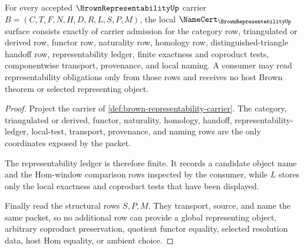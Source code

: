 \begin{theorem}
\label{thm:brown-representability-namecert-obligations}
For every accepted $\BrownRepresentabilityUp$ carrier $B=(C,T,F,N,H,D,R,L,S,P,M)$, the local $\NameCert_{\BrownRepresentabilityUp}$ surface consists exactly of carrier admission for the category row, triangulated or derived row, functor row, naturality row, homology row, distinguished-triangle handoff row, representability ledger, finite exactness and coproduct tests, componentwise transport, provenance, and local naming. A consumer may read representability obligations only from those rows and receives no host Brown theorem or selected representing object.
\end{theorem}
\begin{proof}
Project the carrier of \autoref{def:brown-representability-carrier}. The category, triangulated or derived, functor, naturality, homology, handoff, representability-ledger, local-test, transport, provenance, and naming rows are the only coordinates exposed by the packet.

The representability ledger is therefore finite. It records a candidate object name and the Hom-window comparison rows inspected by the consumer, while $L$ stores only the local exactness and coproduct tests that have been displayed.

Finally read the structural rows $S,P,M$. They transport, source, and name the same packet, so no additional row can provide a global representing object, arbitrary coproduct preservation, quotient functor equality, selected resolution data, host Hom equality, or ambient choice.
\end{proof}

